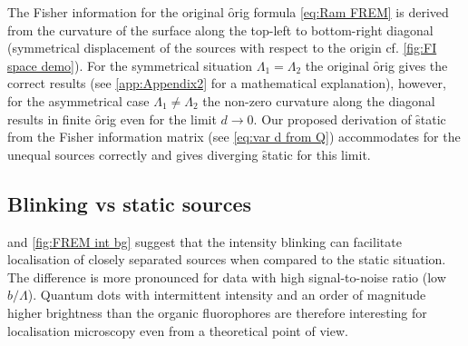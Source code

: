 The Fisher information for the original \f{orig} formula \autoref{eq:Ram FREM} is derived from the curvature of the surface along the top-left to bottom-right diagonal (symmetrical displacement of the sources with respect to the origin cf. \autoref{fig:FI space demo}). For the symmetrical situation $\Lambda_1=\Lambda_2$ the original \f{orig} gives the correct results (see \autoref{app:Appendix2} for a mathematical explanation), however, for the asymmetrical case $\Lambda_1\neq\Lambda_2$ the non-zero curvature along the diagonal results in finite \f{orig} even for the limit $d\rightarrow 0$. Our proposed derivation of \f{static} from the Fisher information matrix (see \autoref{eq:var d from Q}) accommodates for the unequal sources correctly and gives diverging \f{static} for this limit. 


\subsection{Blinking vs static sources\label{sub:Blink vs static}}

 and \autoref{fig:FREM int bg} suggest that the intensity blinking can facilitate localisation of closely separated sources when compared to the static situation. The difference is more pronounced for data with high signal-to-noise ratio (low $b/\Lambda$). Quantum dots with intermittent intensity and an order of magnitude higher brightness than the organic fluorophores are therefore interesting for localisation microscopy even from a theoretical point of view.


